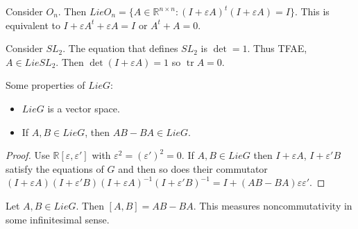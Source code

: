 \documentclass{article}
\newcommand{\R}{\mathbb{R}}
\newcommand{\eps}{\varepsilon}
\DeclareMathOperator{\tr}{tr}
\begin{document}
\begin{example}
Consider $O_n$. Then $Lie O_n=\{A\in\R^{n\times n}:(I+\eps A)^t(I+\eps A)=I\}$. This is equivalent to $I+\eps A^t+\eps A=I$ or $A^t+A=0$.
\end{example}
\begin{example}
Consider $SL_2$. The equation that defines $SL_2$ is $\det=1$. Thus TFAE, $A\in Lie SL_2$. Then $\det(I+\eps A)=1$ so $\tr A=0$.
\end{example}
Some properties of $Lie G$:
\begin{itemize}
    \item $Lie G$ is a vector space.
    \item If $A,B\in Lie G$, then $AB-BA\in Lie G$.
\end{itemize}
\begin{proof}
Use $\R[\eps,\eps']$ with $\eps^2=(\eps')^2=0$. If $A,B\in Lie G$ then $I+\eps A$, $I+\eps'B$ satisfy the equations of $G$ and then so does their commutator $(I+\eps A)(I+\eps'B)(I+\eps A)^{-1}(I+\eps' B)^{-1}=I+(AB-BA)\eps\eps'$.
\end{proof}
\begin{definition}
Let $A,B\in Lie G$. Then $[A,B]=AB-BA$. This measures noncommutativity in some infinitesimal sense.
\end{definition}
\end{document}
